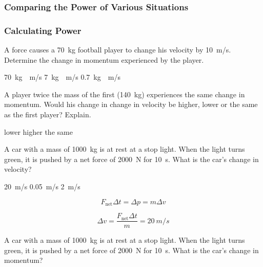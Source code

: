 \documentclass[../main-physics-problems.tex]{subfiles}
\begin{document}
\subsubsection{Comparing the Power of Various Situations}
\subsubsection{Calculating Power}

\begin{questions}
\question
A force causes a \SI{70}{kg} football player to change his velocity by \SI{10}{m/s}. Determine the change in momentum experienced by the player.

\begin{randomizechoices}
    \correctchoice \SI{70}{kg\cdot m/s}
    \choice \SI{7}{kg\cdot m/s}
    \choice \SI{0.7}{kg\cdot m/s}
\end{randomizechoices}

\question
A player twice the mass of the first (\SI{140}{kg}) experiences the same change in momentum.  Would his change in change in velocity be higher, lower or the same as the first player?  Explain.

\begin{randomizechoices}
    \correctchoice lower
    \choice higher
    \choice the same
\end{randomizechoices}

\question
A car with a mass of \SI{1000}{kg} is at rest at a stop light.  When the light turns green, it is pushed by a net force of \SI{2000}{N} for \SI{10}{s}. What is the car's change in velocity?

\begin{randomizechoices}
    \correctchoice \SI{20}{m/s}
    \choice \SI{0.05}{m/s}
    \choice \SI{2}{m/s}
\end{randomizechoices}

\begin{solution}
\begin{equation*}
    F_\mathrm{net} \Delta t = \Delta p = m \Delta v
\end{equation*}

\begin{equation*}
    \Delta v = \frac{F_\mathrm{net}\Delta t}{m} = \boxed{\SI{20}{m/s}}
\end{equation*}
\end{solution}

\question
A car with a mass of \SI{1000}{kg} is at rest at a stop light. When the light turns green, it is pushed by a net force of \SI{2000}{N} for \SI{10}{s}. What is the car's change in momentum?


\end{questions}
\end{document}
